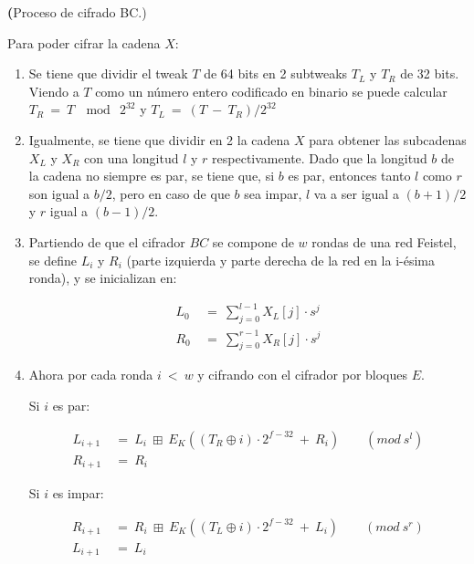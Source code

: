
\textbf(Proceso de cifrado BC.)

Para poder cifrar la cadena $X$:

\begin{enumerate}

  \item Se tiene que dividir el tweak $T$ de 64 bits en 2 subtweaks $T_L$ y 
    $T_R$ de 32 bits. Viendo a $T$ como un número entero codificado en binario 
    se puede calcular $T_R\: =\: T\: \mod\: 2^{32}$ y 
    $T_L\: =\: (T\: -\: T_R) / 2^{32}$

  \item Igualmente, se tiene que dividir en 2 la cadena $X$ para obtener las
    subcadenas $X_L$ y $X_R$ con una longitud $l$ y $r$ respectivamente. 
    Dado que la longitud $b$ de la cadena no siempre es par, se tiene que, si 
    $b$ es par, entonces tanto $l$ como $r$ son igual a $b/2$, pero en caso 
    de que $b$ sea impar, $l$ va a ser igual a $(b+1)/2$ y $r$ igual a 
    $(b-1)/2$.
  
  \item Partiendo de que el cifrador $BC$ se compone de $w$ rondas de una red 
    Feistel, se define $L_i$ y $R_i$ (parte izquierda y parte derecha de la 
    red en la i-ésima ronda), y se inicializan en:

    \begin{align}
      L_0\: &=\: \sum_{j=0}^{l-1} X_L[j] \cdot s^j \\
      R_0\: &=\: \sum_{j=0}^{r-1} X_R[j] \cdot s^j
    \end{align}
  
  \item Ahora por cada ronda $i\: <\: w$ y cifrando con el cifrador por 
    bloques $E$.

    Si $i$ es par:

    \begin{align}
      L_{i+1}\: &=\: L_i\: \boxplus\: 
                    E_K((T_R \oplus i) \cdot 2^{f-32}\: +\: R_i)\qquad 
                    (mod\ s^l) \\
      R_{i+1}\: &=\: R_i
    \end{align}

    Si $i$ es impar:

    \begin{align}
      R_{i+1}\: &=\: R_i\: \boxplus\: 
                    E_K((T_L \oplus i) \cdot 2^{f-32}\: +\: L_i)\qquad 
                    (mod\ s^r) \\
      L_{i+1}\: &=\: L_i
    \end{align}
  

\end{enumerate}
